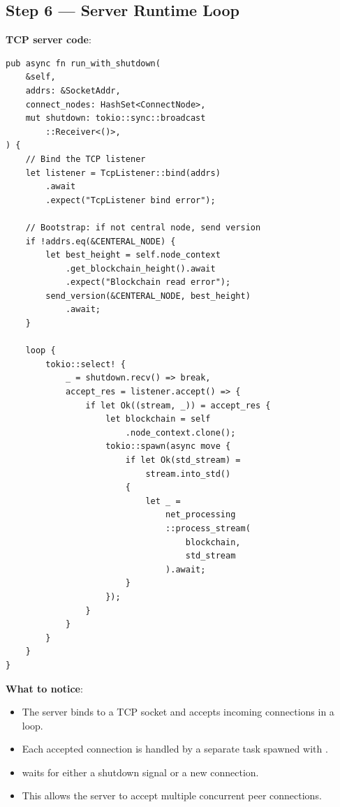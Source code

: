 \subsection{Step 6 --- Server Runtime Loop}
\label{sec:ch09-8-step6}

\textbf{TCP server code}: 

\begin{listing}[H]
\caption{P2P accept loop ()}
\label{lst:9-8-6}
\begin{verbatim}
pub async fn run_with_shutdown(
    &self,
    addrs: &SocketAddr,
    connect_nodes: HashSet<ConnectNode>,
    mut shutdown: tokio::sync::broadcast
        ::Receiver<()>,
) {
    // Bind the TCP listener
    let listener = TcpListener::bind(addrs)
        .await
        .expect("TcpListener bind error");

    // Bootstrap: if not central node, send version
    if !addrs.eq(&CENTERAL_NODE) {
        let best_height = self.node_context
            .get_blockchain_height().await
            .expect("Blockchain read error");
        send_version(&CENTERAL_NODE, best_height)
            .await;
    }

    loop {
        tokio::select! {
            _ = shutdown.recv() => break,
            accept_res = listener.accept() => {
                if let Ok((stream, _)) = accept_res {
                    let blockchain = self
                        .node_context.clone();
                    tokio::spawn(async move {
                        if let Ok(std_stream) =
                            stream.into_std()
                        {
                            let _ =
                                net_processing
                                ::process_stream(
                                    blockchain,
                                    std_stream
                                ).await;
                        }
                    });
                }
            }
        }
    }
}
\end{verbatim}
\end{listing}

\textbf{What to notice}:
\begin{itemize}
  \item The server binds to a TCP socket and accepts incoming connections in a loop.
  \item Each accepted connection is handled by a separate task spawned with .
  \item {} waits for either a shutdown signal or a new connection.
  \item This allows the server to accept multiple concurrent peer connections.
\end{itemize}

